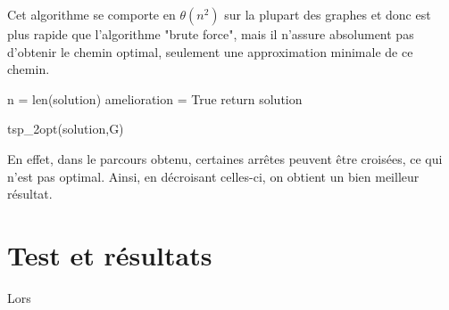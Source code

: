 \documentclass{report}
\begin{document}
  Cet algorithme se comporte en $\theta (n^2)$ sur la plupart des graphes et donc est plus rapide que l'algorithme "brute force", mais il n'assure absolument pas d'obtenir le chemin optimal, seulement une approximation minimale de ce chemin.\\
  \newline
  \begin{algorithm}[H]
    \SetAlgoLined
    n = len(solution)\;
    amelioration = True\;
    return solution\;
    \caption{tsp\_2opt(solution,G)}
  \end{algorithm}

En effet, dans le parcours obtenu, certaines arrêtes peuvent être croisées, ce qui n'est pas optimal. Ainsi, en décroisant celles-ci, on obtient un bien meilleur résultat.

\section {Test et résultats}

Lors 
\end{document}
